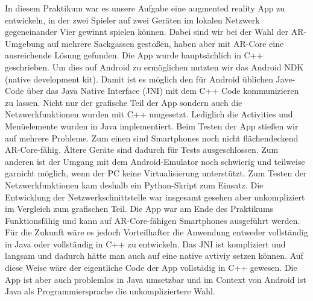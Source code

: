 In diesem Praktikum war es unsere Aufgabe eine augmented reality App zu entwickeln,
in der zwei Spieler auf zwei Geräten im lokalen Netzwerk gegeneinander
Vier gewinnt spielen können. Dabei sind wir bei der Wahl der AR-Umgebung auf mehrere Sackgassen
gestoßen, haben aber mit AR-Core eine ausreichende Lösung gefunden. Die App wurde hauptsächlich in C++ geschrieben.
Um dies auf Android zu ermöglichen nutzten wir das Android NDK (native development kit). Damit ist es möglich
den für Android üblichen Jave-Code über das Java Native Interface (JNI) mit dem C++ Code kommunizieren
zu lassen. Nicht nur der grafische Teil der App sondern auch die Netzwerkfunktionen wurden mit C++ umgesetzt.
Lediglich die Activities und Menüelemente wurden in Java implementiert.
Beim Testen der App stießen wir auf mehrere Probleme. Zum einen sind Smartphones noch nicht flächendeckend
AR-Core-fähig. Ältere Geräte sind dadurch für Tests ausgeschlossen. Zum anderen ist der Umgang mit dem Android-Emulator
noch schwierig und teilweise garnicht möglich, wenn der PC keine Virtualisierung unterstützt.
Zum Testen der Netzwerkfunktionen kam deshalb ein Python-Skript zum Einsatz.
Die Entwicklung der Netzwerkschnittstelle war insgesamt gesehen aber unkompliziert im Vergleich zum grafischen Teil.
Die App war am Ende des Praktikums Funktionsfähig und kann auf AR-Core-fähigen Smartphones ausgeführt werden.
Für die Zukunft wäre es jedoch Vorteilhafter die Anwendung entweder vollständig in Java oder vollständig in C++
zu entwickeln. Das JNI ist kompliziert und langsam und dadurch hätte man auch auf eine native avtiviy setzen können.
Auf diese Weise wäre der eigentliche Code der App vollstädig in C++ gewesen. Die App ist aber auch
problemlos in Java umsetzbar und im Context von Android ist Java als Programmiersprache die unkompliziertere Wahl.

